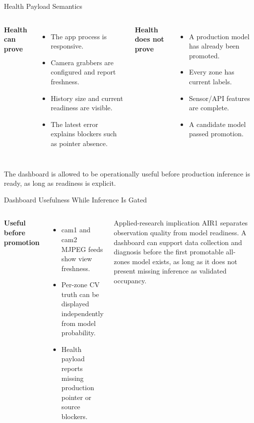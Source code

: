 \documentclass[aspectratio=169]{beamer}
\begin{document}
\begin{frame}[shrink=4]{Health Payload Semantics}
\begin{columns}[T,onlytextwidth]
\textbf{Health can prove}
\begin{itemize}
  \item The app process is responsive.
  \item Camera grabbers are configured and report freshness.
  \item History size and current readiness are visible.
  \item The latest error explains blockers such as pointer absence.
\end{itemize}

\textbf{Health does not prove}
\begin{itemize}
  \item A production model has already been promoted.
  \item Every zone has current labels.
  \item Sensor/API features are complete.
  \item A candidate model passed promotion.
\end{itemize}
\end{columns}
\tightsep
\begin{center}
\parbox{0.82\textwidth}{\centering\small The dashboard is allowed to be operationally useful before production inference is ready, as long as readiness is explicit.}
\end{center}
\end{frame}

\begin{frame}[shrink=4]{Dashboard Usefulness While Inference Is Gated}
\begin{columns}[T,onlytextwidth]
\textbf{Useful before promotion}
\begin{itemize}
  \item cam1 and cam2 MJPEG feeds show view freshness.
  \item Per-zone CV truth can be displayed independently from model probability.
  \item Health payload reports missing production pointer or source blockers.
\end{itemize}

\begin{block}{Applied-research implication}
\small AIR1 separates observation quality from model readiness. A dashboard can
support data collection and diagnosis before the first promotable all-zones
model exists, as long as it does not present missing inference as validated
occupancy.
\end{block}
\tightsep
{}
\hspace{0.35em}
\hspace{0.35em}
\hspace{0.35em}
\end{columns}
\end{frame}
\end{document}
